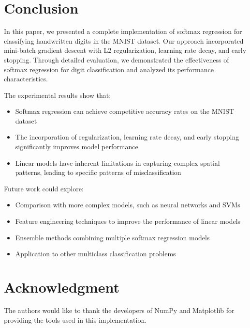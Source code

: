 \documentclass[10pt,journal,compsoc]{IEEEtran}
\begin{document}
\section{Conclusion}
In this paper, we presented a complete implementation of softmax regression for classifying handwritten digits in the MNIST dataset. Our approach incorporated mini-batch gradient descent with L2 regularization, learning rate decay, and early stopping. Through detailed evaluation, we demonstrated the effectiveness of softmax regression for digit classification and analyzed its performance characteristics.

The experimental results show that:
\begin{itemize}
    \item Softmax regression can achieve competitive accuracy rates on the MNIST dataset
    \item The incorporation of regularization, learning rate decay, and early stopping significantly improves model performance
    \item Linear models have inherent limitations in capturing complex spatial patterns, leading to specific patterns of misclassification
\end{itemize}

Future work could explore:
\begin{itemize}
    \item Comparison with more complex models, such as neural networks and SVMs
    \item Feature engineering techniques to improve the performance of linear models
    \item Ensemble methods combining multiple softmax regression models
    \item Application to other multiclass classification problems
\end{itemize}

\section*{Acknowledgment}
The authors would like to thank the developers of NumPy and Matplotlib for providing the tools used in this implementation.
\end{document}
